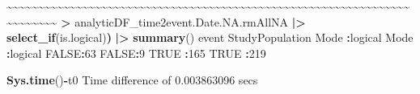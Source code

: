 \documentclass[
]{article}
\newenvironment{Shaded}{\begin{snugshade}}{\end{snugshade}}
\newcommand{\ConstantTok}[1]{\textcolor[rgb]{0.56,0.35,0.01}{#1}}
\newcommand{\DecValTok}[1]{\textcolor[rgb]{0.00,0.00,0.81}{#1}}
\newcommand{\ErrorTok}[1]{\textcolor[rgb]{0.64,0.00,0.00}{\textbf{#1}}}
\newcommand{\FloatTok}[1]{\textcolor[rgb]{0.00,0.00,0.81}{#1}}
\newcommand{\FunctionTok}[1]{\textcolor[rgb]{0.13,0.29,0.53}{\textbf{#1}}}
\newcommand{\NormalTok}[1]{#1}
\newcommand{\SpecialCharTok}[1]{\textcolor[rgb]{0.81,0.36,0.00}{\textbf{#1}}}
\begin{document}
\begin{Shaded}
\begin{Highlighting}[]
    \SpecialCharTok{\textasciitilde{}}\ErrorTok{\textasciitilde{}\textasciitilde{}\textasciitilde{}\textasciitilde{}\textasciitilde{}\textasciitilde{}\textasciitilde{}\textasciitilde{}\textasciitilde{}\textasciitilde{}\textasciitilde{}\textasciitilde{}\textasciitilde{}\textasciitilde{}\textasciitilde{}\textasciitilde{}\textasciitilde{}\textasciitilde{}\textasciitilde{}\textasciitilde{}\textasciitilde{}\textasciitilde{}\textasciitilde{}\textasciitilde{}\textasciitilde{}\textasciitilde{}\textasciitilde{}\textasciitilde{}\textasciitilde{}\textasciitilde{}\textasciitilde{}\textasciitilde{}\textasciitilde{}\textasciitilde{}\textasciitilde{}\textasciitilde{}\textasciitilde{}\textasciitilde{}\textasciitilde{}\textasciitilde{}\textasciitilde{}\textasciitilde{}\textasciitilde{}\textasciitilde{}\textasciitilde{}\textasciitilde{}\textasciitilde{}\textasciitilde{}\textasciitilde{}\textasciitilde{}\textasciitilde{}\textasciitilde{}\textasciitilde{}\textasciitilde{}\textasciitilde{}\textasciitilde{}\textasciitilde{}\textasciitilde{}\textasciitilde{}\textasciitilde{}\textasciitilde{}\textasciitilde{}\textasciitilde{}\textasciitilde{}\textasciitilde{}\textasciitilde{}\textasciitilde{}\textasciitilde{}\textasciitilde{}\textasciitilde{}\textasciitilde{}}    
 \ErrorTok{\textgreater{}}\NormalTok{ analyticDF\_time2event.Date.NA.rmAllNA }\SpecialCharTok{|\textgreater{}} \FunctionTok{select\_if}\NormalTok{(is.logical)}\ErrorTok{)} \SpecialCharTok{|\textgreater{}} \FunctionTok{summary}\NormalTok{()  }
\NormalTok{   event         StudyPopulation}
\NormalTok{ Mode }\SpecialCharTok{:}\NormalTok{logical   Mode }\SpecialCharTok{:}\NormalTok{logical  }
 \ConstantTok{FALSE}\SpecialCharTok{:}\DecValTok{63}        \ConstantTok{FALSE}\SpecialCharTok{:}\DecValTok{9}        
 \ConstantTok{TRUE} \SpecialCharTok{:}\DecValTok{165}       \ConstantTok{TRUE} \SpecialCharTok{:}\DecValTok{219}      
\end{Highlighting}
\end{Shaded}

\begin{Shaded}
\begin{Highlighting}[]
\FunctionTok{Sys.time}\NormalTok{()}\SpecialCharTok{{-}}\NormalTok{t0}
\NormalTok{Time difference of }\FloatTok{0.003863096}\NormalTok{ secs}
\end{Highlighting}
\end{Shaded}
\end{document}
